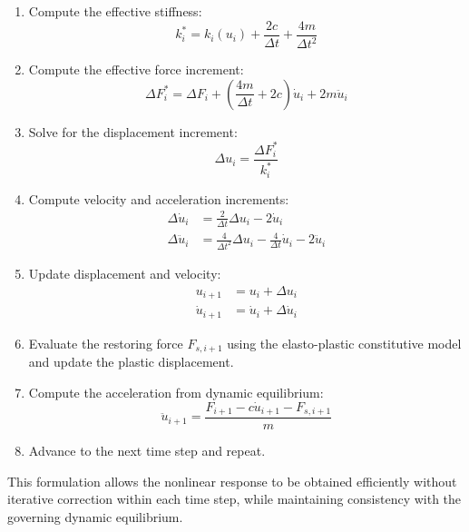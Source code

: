 \begin{enumerate}
\item Compute the effective stiffness:
\begin{equation}
k_i^* = k_i(u_i) + \frac{2c}{\Delta t} + \frac{4m}{\Delta t^2}
\end{equation}

\item Compute the effective force increment:
\begin{equation}
\Delta F_i^* = \Delta F_i + \left(\frac{4m}{\Delta t} + 2c\right)\dot{u}_i + 2m \ddot{u}_i
\end{equation}

\item Solve for the displacement increment:
\begin{equation}
\Delta u_i = \frac{\Delta F_i^*}{k_i^*}
\end{equation}

\item Compute velocity and acceleration increments:
\begin{align}
\Delta \dot{u}_i &= \frac{2}{\Delta t}\Delta u_i - 2\dot{u}_i \\
\Delta \ddot{u}_i &= \frac{4}{\Delta t^2}\Delta u_i - \frac{4}{\Delta t}\dot{u}_i - 2\ddot{u}_i
\end{align}

\item Update displacement and velocity:
\begin{align}
u_{i+1} &= u_i + \Delta u_i \\
\dot{u}_{i+1} &= \dot{u}_i + \Delta \dot{u}_i
\end{align}

\item Evaluate the restoring force $F_{s,i+1}$ using the elasto-plastic
constitutive model and update the plastic displacement.

\item Compute the acceleration from dynamic equilibrium:
\begin{equation}
\ddot{u}_{i+1} = \frac{F_{i+1} - c\dot{u}_{i+1} - F_{s,i+1}}{m}
\end{equation}

\item Advance to the next time step and repeat.
\end{enumerate}

This formulation allows the nonlinear response to be obtained efficiently
without iterative correction within each time step, while maintaining
consistency with the governing dynamic equilibrium.


